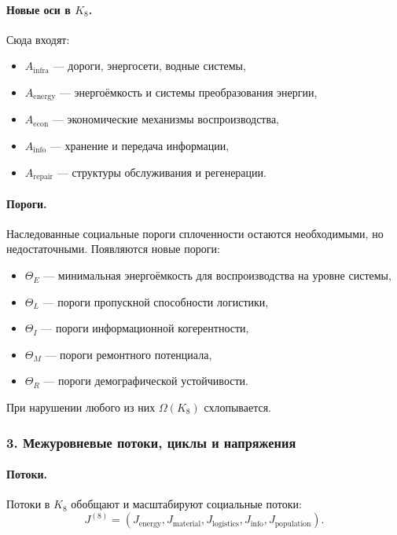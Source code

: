 \paragraph{Новые оси в \texorpdfstring{$K_8$}{K_8}.}
Сюда входят:
\begin{itemize}
  \item $A_{\mathrm{infra}}$ — дороги, энергосети, водные системы,
  \item $A_{\mathrm{energy}}$ — энергоёмкость и системы преобразования энергии,
  \item $A_{\mathrm{econ}}$ — экономические механизмы воспроизводства,
  \item $A_{\mathrm{info}}$ — хранение и передача информации,
  \item $A_{\mathrm{repair}}$ — структуры обслуживания и регенерации.
\end{itemize}

\paragraph{Пороги.}
Наследованные социальные пороги сплоченности остаются необходимыми, но
недостаточными.
Появляются новые пороги:
\begin{itemize}
  \item $\Theta_E$ — минимальная энергоёмкость для воспроизводства на уровне
        системы,
  \item $\Theta_L$ — пороги пропускной способности логистики,
  \item $\Theta_I$ — пороги информационной когерентности,
  \item $\Theta_M$ — пороги ремонтного потенциала,
  \item $\Theta_R$ — пороги демографической устойчивости.
\end{itemize}

При нарушении любого из них $\Omega(K_8)$ схлопывается.

\subsubsection{3. Межуровневые потоки, циклы и напряжения}

\paragraph{Потоки.}
Потоки в $K_8$ обобщают и масштабируют социальные потоки:
\[
J^{(8)} = (J_{\mathrm{energy}}, J_{\mathrm{material}},
          J_{\mathrm{logistics}}, J_{\mathrm{info}},
          J_{\mathrm{population}}).
\]


